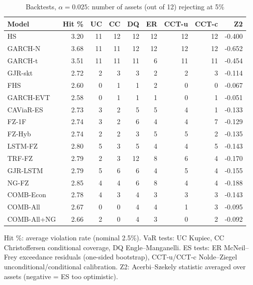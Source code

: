\begin{table}[htbp]
\centering
\footnotesize
\caption{Backtests, $\alpha=0.025$: number of assets (out of 12) rejecting at 5\%}
\label{tab:bt_a025}
\begin{tabular}{lrrrrrrrr}
\toprule
Model & Hit \% & UC & CC & DQ & ER & CCT-u & CCT-c & Z2 \\
\midrule
HS & 3.20 & 11 & 12 & 12 & 12 & 12 & 12 & -0.400 \\
GARCH-N & 3.68 & 11 & 11 & 12 & 12 & 12 & 12 & -0.652 \\
GARCH-t & 3.51 & 11 & 11 & 11 & 6 & 11 & 11 & -0.454 \\
GJR-skt & 2.72 & 2 & 3 & 3 & 2 & 2 & 3 & -0.114 \\
FHS & 2.60 & 0 & 1 & 1 & 2 & 0 & 0 & -0.067 \\
GARCH-EVT & 2.58 & 0 & 1 & 1 & 1 & 0 & 1 & -0.051 \\
CAViaR-ES & 2.73 & 3 & 2 & 5 & 5 & 4 & 1 & -0.133 \\
FZ-1F & 2.74 & 3 & 2 & 6 & 4 & 4 & 7 & -0.129 \\
FZ-Hyb & 2.74 & 2 & 2 & 3 & 5 & 5 & 2 & -0.135 \\
LSTM-FZ & 2.80 & 5 & 3 & 5 & 4 & 4 & 5 & -0.143 \\
TRF-FZ & 2.79 & 2 & 3 & 12 & 8 & 6 & 4 & -0.170 \\
GJR-LSTM & 2.79 & 5 & 6 & 6 & 4 & 5 & 4 & -0.155 \\
NG-FZ & 2.85 & 4 & 4 & 6 & 8 & 4 & 4 & -0.188 \\
COMB-Econ & 2.78 & 4 & 3 & 4 & 3 & 3 & 3 & -0.143 \\
COMB-All & 2.67 & 0 & 0 & 4 & 4 & 1 & 3 & -0.095 \\
COMB-All+NG & 2.66 & 2 & 0 & 4 & 3 & 0 & 2 & -0.092 \\
\bottomrule
\end{tabular}
\par\smallskip\parbox{\linewidth}{\scriptsize Hit \%: average violation rate (nominal 2.5\%). VaR tests: UC Kupiec, CC Christoffersen conditional coverage, DQ Engle--Manganelli. ES tests: ER McNeil--Frey exceedance residuals (one-sided bootstrap), CCT-u/CCT-c Nolde--Ziegel unconditional/conditional calibration. Z2: Acerbi--Szekely statistic averaged over assets (negative = ES too optimistic).}
\end{table}